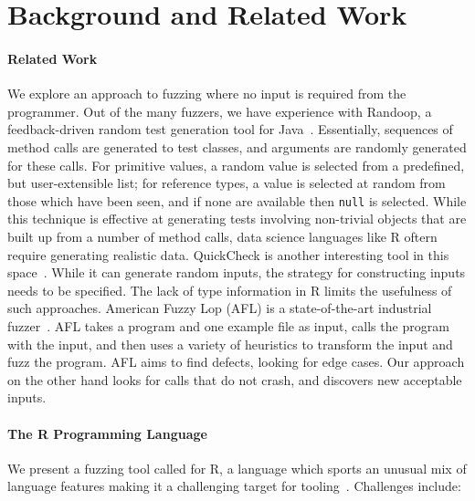 \documentclass[sigplan,nonacm,anonymous,review]{acmart}
\begin{document}
\section{Background and Related Work}
\label{sec:background}

\paragraph{Related Work}
We explore an approach to fuzzing where no input is required from the
programmer.  Out of the many fuzzers, we have experience with Randoop,
a feedback-driven random test generation tool for
Java~\cite{pacheco2007randoop}.  Essentially, sequences of method
calls are generated to test classes, and arguments are randomly
generated for these calls. For primitive values, a random value is
selected from a predefined, but user-extensible list; for reference
types, a value is selected at random from those which have been seen,
and if none are available then {\tt null} is selected.  While this
technique is effective at generating tests involving non-trivial
objects that are built up from a number of method calls, data science
languages like R oftern require generating realistic data.  QuickCheck
is another interesting tool in this space~\cite{quickcheck}.  While it
can generate random inputs, the strategy for constructing inputs needs
to be specified.  The lack of type information in R limits the
usefulness of such approaches. American Fuzzy Lop (AFL) is a
state-of-the-art industrial fuzzer~\cite{afl}. AFL takes a program and
one example file as input, calls the program with the input, and then
uses a variety of heuristics to transform the input and fuzz the
program.  AFL aims to find defects, looking for edge cases.  Our
approach on the other hand looks for calls that do not crash, and
discovers new acceptable inputs.

\paragraph{The R Programming Language}

We present a fuzzing tool called \tool for R, a language which sports an unusual mix of
language features making it a challenging target for
tooling~\cite{morandat2012evaluating}.  Challenges include:
\end{document}
